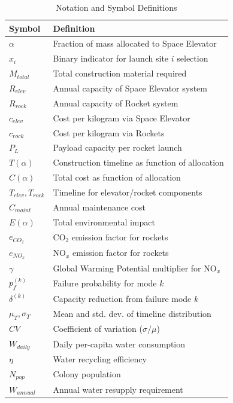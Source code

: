\documentclass[12pt]{article}
\begin{document}
\begin{table}[H] %
	\centering %
	\caption{Notation and Symbol Definitions} %
	\label{tab:notation} %
	\begin{tabularx}{\textwidth}{ 
			>{\hsize=0.4\hsize\centering\arraybackslash}X 
			>{\hsize=1.6\hsize\centering\arraybackslash}X 
		}
		\toprule
		Symbol & Definition \\
		\midrule
		$\alpha$ & Fraction of mass allocated to Space Elevator  \\
		$x_i$ & Binary indicator for launch site $i$ selection  \\
		$M_{total}$ & Total construction material required  \\
		$R_{elev}$ & Annual capacity of Space Elevator system  \\
		$R_{rock}$ & Annual capacity of Rocket system  \\
		$c_{elev}$ & Cost per kilogram via Space Elevator  \\
		$c_{rock}$ & Cost per kilogram via Rockets  \\
		$P_L$ & Payload capacity per rocket launch  \\
		$T(\alpha)$ & Construction timeline as function of allocation  \\
		$C(\alpha)$ & Total cost as function of allocation  \\
		$T_{elev}, T_{rock}$ & Timeline for elevator/rocket components  \\
		$C_{maint}$ & Annual maintenance cost  \\
		$E(\alpha)$ & Total environmental impact  \\
		$e_{CO_2}$ & CO$_2$ emission factor for rockets  \\
		$e_{NO_x}$ & NO$_x$ emission factor for rockets  \\
		$\gamma$ & Global Warming Potential multiplier for NO$_x$  \\
		$p_f^{(k)}$ & Failure probability for mode $k$  \\
		$\delta^{(k)}$ & Capacity reduction from failure mode $k$  \\
		$\mu_T, \sigma_T$ & Mean and std. dev. of timeline distribution  \\
		$CV$ & Coefficient of variation ($\sigma/\mu$)  \\
		$W_{daily}$ & Daily per-capita water consumption  \\
		$\eta$ & Water recycling efficiency  \\
		$N_{pop}$ & Colony population  \\
		$W_{annual}$ & Annual water resupply requirement  \\
		\bottomrule
	\end{tabularx}
\end{table}
\end{document}
